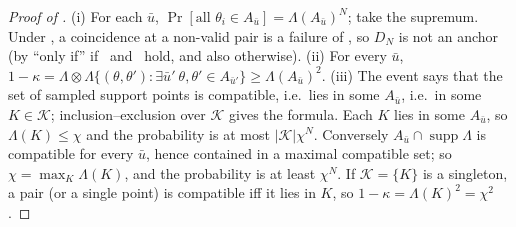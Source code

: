 \begin{proof}[Proof of ]
(i) For each $\bar u$, $\Pr[\text{all }\theta_i\in A_{\bar u}]=\Lambda(A_{\bar u})^N$; take the supremum. Under \Rich, a coincidence at a non-valid pair is a failure of \evU, so $D_N$ is not an anchor (by  ``only if'' if \evRs\ and \evN\ hold, and also otherwise). (ii) For every $\bar u$, $1-\kappa=\Lambda\otimes\Lambda\{(\theta,\theta'):\exists\bar u'\ \theta,\theta'\in A_{\bar u'}\}\ge\Lambda(A_{\bar u})^2$. (iii) The event says that the set of sampled support points is compatible, i.e.\ lies in some $A_{\bar u}$, i.e.\ in some $K\in\mathcal K$; inclusion--exclusion over $\mathcal K$ gives the formula. Each $K$ lies in some $A_{\bar u}$, so $\Lambda(K)\le\chi$ and the probability is at most $|\mathcal K|\chi^N$. Conversely $A_{\bar u}\cap\operatorname{supp}\Lambda$ is compatible for every $\bar u$, hence contained in a maximal compatible set; so $\chi=\max_K\Lambda(K)$, and the probability is at least $\chi^N$. If $\mathcal K=\{K\}$ is a singleton, a pair (or a single point) is compatible iff it lies in $K$, so $1-\kappa=\Lambda(K)^2=\chi^2$.
\end{proof}

